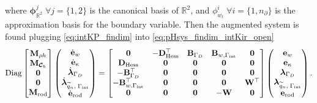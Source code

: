 where $\bm{\phi}^j_{\mathbb{R}^2}  \; \forall j = \{1, 2\}$ is the canonical basis of $\mathbb{R}^2$, and ${\phi}^i_{w_t}  \; \forall i = \{1,n_\partial\}$ is the approximation basis for the boundary variable. Then the augmented system is found plugging \eqref{eq:intKP_findim} into \eqref{eq:pHsys_findim_intKir_open}
\begin{equation}\label{eq:pHsys_findim_intKir_closed}
\mathrm{Diag}
\begin{bmatrix}
\mathbf{M}_{\rho h}\\
\mathbf{M}_{\bm{\mathcal{C}}_b}\\
\mathbf{0}\\
\mathbf{0}\\
\mathbf{M}_{\mathrm{rod}}\\
\end{bmatrix}
\begin{pmatrix}
\dot{\mathbf{e}}_{w} \\
\dot{\mathbf{e}}_{\kappa} \\
\dot{\bm{\lambda}}_{\Gamma_D} \\
\dot{\bm{\lambda}}_{\widetilde{q}_n, \; \Gamma_{\mathrm{int}}} \\
\dot{\mathbf{e}}_{\mathrm{rod}} \\
\end{pmatrix}
= \begin{bmatrix}
\mathbf{0} & - \mathbf{D}_{\operatorname*{Hess}}^\top & \mathbf{B}_{\Gamma_D} & \mathbf{B}_{w, \Gamma_{\mathrm{int}}} & \mathbf{0}\\
\mathbf{D}_{\operatorname*{Hess}} & \mathbf{0} & \mathbf{0} & \mathbf{0} & \mathbf{0}\\
-\mathbf{B}_{\Gamma_D}^\top & \mathbf{0} & \mathbf{0} & \mathbf{0} & \mathbf{0} \\
-\mathbf{B}_{w, \Gamma_{\mathrm{int}}}^\top & \mathbf{0} & \mathbf{0} & \mathbf{0} & \mathbf{W}^\top \\
\mathbf{0} & \mathbf{0} & \mathbf{0} & - \mathbf{W} & \mathbf{0} \\
\end{bmatrix} 
\begin{pmatrix}
{\mathbf{e}}_{w} \\
{\mathbf{e}}_{\kappa} \\
{\bm{\lambda}}_{\Gamma_D} \\
{\bm{\lambda}}_{\widetilde{q}_n, \;\Gamma_{\mathrm{int}}} \\
\mathbf{e}_{\mathrm{rod}} \\
\end{pmatrix}.
\end{equation}

